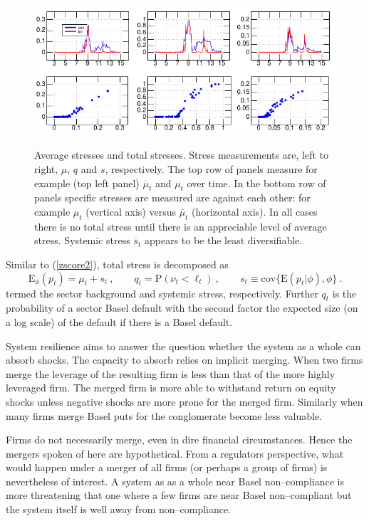 \documentclass[authoryear]{elsarticle}
\newcommand{\E}{\mathrm{E}}
\newcommand{\cov}{\mathrm{cov}}
\newcommand{\Es}{\E_\phi}
\newcommand{\eref}[1]{(\ref{#1})}
\newcommand{\cq}{\ , \qquad}
\renewcommand{\P}{\mathrm{P}}
\newcommand{\be}[1]{\begin{equation}\label{#1}}
\newcommand{\ee}{\end{equation}}
\begin{document}
\begin{figure}[htbp]
\begin{center}
\label{muqs}
\includegraphics{figures/muqs.pdf}
\caption{Average  stresses and  total stresses.   Stress measurements are, left to right, $\mu$, $q$ and $s$, respectively.   The top row of panels measure for example (top left panel)  $\overline \mu_t$ and $\mu_t$ over time.    In the bottom row of panels  specific stresses are measured are against each other:  for example $\mu_t$ (vertical axis) versus $\overline\mu_t$ (horizontal axis).  In all cases there is no total stress until there is an appreciable level of average stress.  Systemic stress $\overline s_t$ appears to be the least diversifiable.}
\end{center}
\end{figure}

Similar  to \eref{zscore2}, total  stress is decomposed as 
\be{overall}
\Es(p_t) = \mu_t  + s_t\cq q_{t}=\P(\nu_t<\ell_t) \cq  s_t \equiv \cov\{\E(p_t|\phi),\phi\}\ .
\ee
termed the sector background  and systemic stress, respectively.   Further $q_t$ is the probability of  a sector Basel default with the second factor the expected size (on a log scale) of the default if there is a Basel default. 

System resilience aims to answer the question whether the system as a whole can absorb shocks.   The capacity to absorb relies on implicit merging.  When two firms merge the leverage of the resulting firm is less than that of the more highly leveraged firm.   The merged firm is more able to withstand return on equity shocks  unless negative shocks are more prone for the merged firm.   Similarly when many firms merge Basel puts for the conglomerate become less valuable.

Firms do not necessarily merge, even in dire financial circumstances.   Hence the mergers spoken of here are hypothetical.   From a regulators perspective, what would happen under a merger of all firms (or perhaps a group of firms) is nevertheless of interest.   A system as as a whole near Basel non--compliance is more threatening that one where a few firms are near Basel non--compliant but the system itself is well away from non--compliance.
\end{document}

